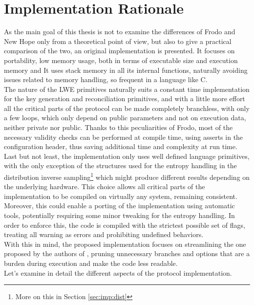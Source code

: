 \section{Implementation Rationale}
As the main goal of this thesis is not to examine the differences of Frodo and New Hope only from a theoretical point of view, but also to give a practical comparison of the two, an original implementation is presented. It focuses on portability, low memory usage, both in terms of executable size and execution memory and It uses stack memory in all its internal functions, naturally avoiding issues related to memory handling, so frequent in a language like C.\\
The nature of the LWE primitives naturally suits a constant time implementation for the key generation and reconciliation primitives, and with a little more effort all the critical parts of the protocol can be made completely branchless, with only a few loops, which only depend on public parameters and not on execution data, neither private nor public. Thanks to this peculiarities of Frodo, most of the necessary validity checks can be performed at compile time, using asserts in the configuration header, thus saving additional time and complexity at run time.\\
Last but not least, the implementation only uses well defined language primitives, with the only exception of the structures used for the entropy handling in the distribution inverse sampling\footnote{More on this in Section \ref{sec:imp:dist}} which might produce different results depending on the underlying hardware. This choice allows all critical parts of the implementation to be compiled on virtually any system, remaining consistent. Moreover, this could enable a porting of the implementation using automatic tools, potentially requiring some minor tweaking for the entropy handling. In order to enforce this, the code is compiled with the strictest possible set of flags, treating all warning as errors and prohibiting undefined behaviors.\\
With this in mind, the proposed implementation focuses on streamlining the one proposed by the authors of \cite{frodo}, pruning unnecessary branches and options that are a burden during execution and make the code less readable.\\
Let's examine in detail the different aspects of the protocol implementation.

